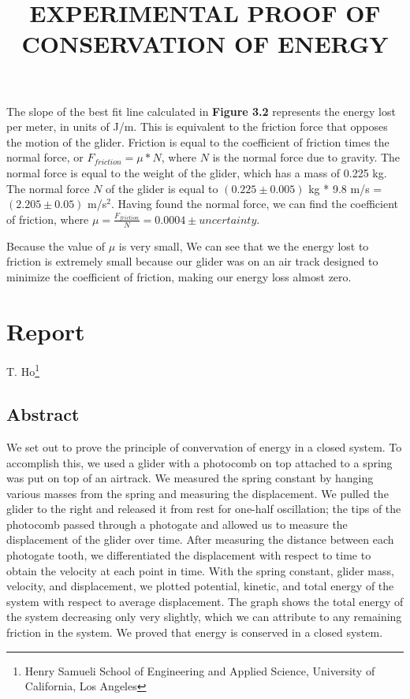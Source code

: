 \documentclass[11pt]{report}
\begin{document}
\newpage
\setlength{\parindent}{5ex}
The slope of the best fit line calculated in \textbf{Figure 3.2} represents the
energy lost per meter, in units of J/m.  This is equivalent to the friction
force that opposes the motion of the glider. Friction is equal to the
coefficient of friction times the normal force, or \(F_{friction} = \mu
* N\), where \(N\) is the normal force due to gravity.  The normal force is
equal to the weight of the glider, which has a mass of 0.225 kg.  The normal
force \(N\) of the glider is equal to \((0.225 \pm 0.005)\) kg * 9.8 m/s = \((2.205
\pm 0.05)\) m/s$^2$.  Having found the normal force, we can find the coefficient
of friction, where \(\mu = \frac{F_{friction}}{N} = 0.0004 \pm uncertainty\).


Because the value of $\mu$ is very small, We can see that we the energy lost 
to friction is extremely small because our glider was on an air track designed 
to minimize the coefficient of friction, making our energy loss almost zero.  


\section*{Report}

\begin{center}
\title{
    \Large \textbf{\uppercase{Experimental Proof of Conservation of Energy}}
}

T. Ho\footnote{Henry Samueli School of Engineering and Applied Science,
University of California, Los Angeles}
\end{center}

\subsection*{Abstract}
We set out to prove the principle of convervation of energy in a closed system.
To accomplish this, we used a glider with a photocomb on top attached to a 
spring was put on top of an airtrack.  We measured the spring constant by
hanging various masses from the spring and measuring the displacement.
We pulled the glider to the right and released it from rest for one-half 
oscillation; the tips of the photocomb passed through a photogate and allowed 
us to measure the displacement of the glider over time.  After measuring the 
distance between each photogate tooth, we differentiated the displacement with 
respect to time to obtain the velocity at each point in time.   With the spring
constant, glider mass, velocity, and displacement, we plotted potential,
kinetic, and total energy of the system with respect to average displacement.
The graph shows the total energy of the system decreasing only very slightly, 
which we can attribute to any remaining friction in the system.  We proved that 
energy is conserved in a closed system.
\end{document}
